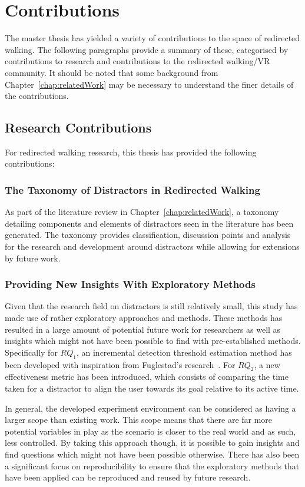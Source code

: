 \section{Contributions}
The master thesis has yielded a variety of contributions to the space of redirected walking. The following paragraphs provide a summary of these, categorised by contributions to research and contributions to the redirected walking/VR community. It should be noted that some background from Chapter~\ref{chap:relatedWork} may be necessary to understand the finer details of the contributions.

\subsection{Research Contributions}
For redirected walking research, this thesis has provided the following contributions: 

\subsubsection{The Taxonomy of Distractors in Redirected Walking}
As part of the literature review in Chapter~\ref{chap:relatedWork}, a taxonomy detailing components and elements of distractors seen in the literature has been generated. The taxonomy provides classification, discussion points and analysis for the research and development around distractors while allowing for extensions by future work. 

\subsubsection{Providing New Insights With Exploratory Methods}
Given that the research field on distractors is still relatively small, this study has made use of rather exploratory approaches and methods. These methods has resulted in a large amount of potential future work for researchers as well as insights which might not have been possible to find with pre-established methods. Specifically for $RQ_1$, an incremental detection threshold estimation method has been developed with inspiration from Fuglestad's research~\cite{fuglestad2018redirected}. For $RQ_2$, a new effectiveness metric has been introduced, which consists of comparing the time taken for a distractor to align the user towards its goal relative to its active time. 

In general, the developed experiment environment can be considered as having a larger scope than existing work. This scope means that there are far more potential variables in play as the scenario is closer to the real world and as such, less controlled. By taking this approach though, it is possible to gain insights and find questions which might not have been possible otherwise. There has also been a significant focus on reproducibility to ensure that the exploratory methods that have been applied can be reproduced and reused by future research. 

